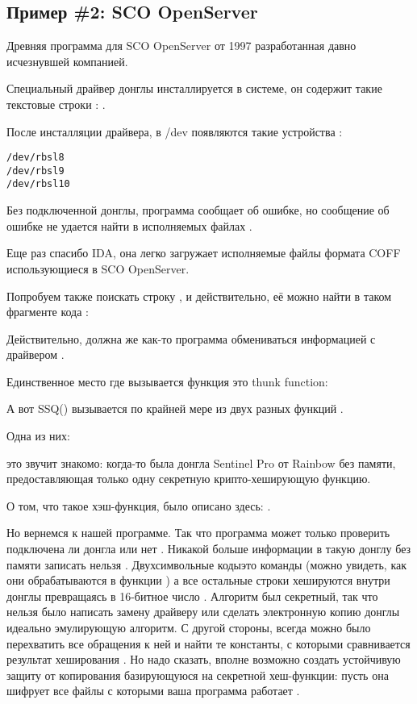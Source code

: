 \subsection{Пример \#2: SCO OpenServer}

\label{examples_SCO}
Древняя программа для SCO OpenServer от 1997 
разработанная давно исчезнувшей компанией.

Специальный драйвер донглы инсталлируется в системе, он содержит такие текстовые строки
:
\AndENRU
{}.

После инсталляции драйвера, в /dev появляются такие устройства
:

\begin{lstlisting}
/dev/rbsl8
/dev/rbsl9
/dev/rbsl10
\end{lstlisting}

Без подключенной донглы, программа сообщает об ошибке, но сообщение об ошибке не удается
найти в исполняемых файлах
.

Еще раз спасибо \ac{IDA}, она легко загружает исполняемые файлы формата COFF использующиеся в
 SCO OpenServer.

Попробуем также поискать строку , и действительно, её можно найти в таком фрагменте кода%
:



Действительно, должна же как-то программа обмениваться информацией с драйвером
.

Единственное место где вызывается функция 
это \gls{thunk function}:



А вот SSQ() вызывается по крайней мере из двух разных функций
.

Одна из них:



 \AndENRU {} \EMDASH{}это звучит знакомо: когда-то была донгла
 Sentinel Pro от Rainbow без памяти,
предоставляющая только одну секретную крипто-хеширующую функцию.

О том, что такое хэш-функция, было описано здесь: .

Но вернемся к нашей программе.
Так что программа может только проверить подключена ли донгла или нет
.
Никакой больше информации в такую донглу без памяти записать нельзя
.
Двухсимвольные коды\EMDASH{}это команды
(можно увидеть, как они обрабатываются в функции 
) 
а все остальные строки хешируются внутри донглы превращаясь в 16-битное число
.
Алгоритм был секретный, так что нельзя было написать замену драйверу или сделать
электронную копию донглы идеально эмулирующую алгоритм.
С другой стороны, всегда можно было перехватить все обращения к ней и найти те константы, с которыми
сравнивается результат хеширования
.
Но надо сказать, вполне возможно создать устойчивую защиту от копирования базирующуюся
на секретной хеш-функции: пусть она шифрует все файлы с которыми ваша программа работает
.

